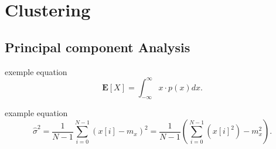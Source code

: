 \section{Clustering}

\subsection{Principal component Analysis}

exemple equation
\begin{equation}
	\mathbf{E}[X] = \int_{-\infty}^{\infty} x \cdot p(x) dx.
\end{equation}

example equation
\begin{equation}
\hat{\sigma}^2 = \frac{1}{N-1}\sum_{i=0}^{N-1}(x[i] - m_x)^2 = \frac{1}{N-1}\left(\sum_{i=0}^{N-1}(x[i]^2) - m_x^2\right).
\end{equation}


